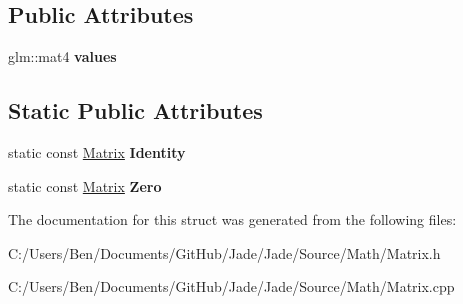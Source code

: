 \subsection*{Public Attributes}
\begin{DoxyCompactItemize}
\item 
\hypertarget{struct_jade_1_1_math_1_1_matrix_ab0c63eb1fb8024339519a780c4a18dc6}{}glm\+::mat4 {\bfseries values}\label{struct_jade_1_1_math_1_1_matrix_ab0c63eb1fb8024339519a780c4a18dc6}

\end{DoxyCompactItemize}
\subsection*{Static Public Attributes}
\begin{DoxyCompactItemize}
\item 
\hypertarget{struct_jade_1_1_math_1_1_matrix_a89bfcd378ee8aeba30f393a9bc431e49}{}static const \hyperlink{struct_jade_1_1_math_1_1_matrix}{Matrix} {\bfseries Identity}\label{struct_jade_1_1_math_1_1_matrix_a89bfcd378ee8aeba30f393a9bc431e49}

\item 
\hypertarget{struct_jade_1_1_math_1_1_matrix_a32ed6952707144091d2bee00c0af4cc4}{}static const \hyperlink{struct_jade_1_1_math_1_1_matrix}{Matrix} {\bfseries Zero}\label{struct_jade_1_1_math_1_1_matrix_a32ed6952707144091d2bee00c0af4cc4}

\end{DoxyCompactItemize}


The documentation for this struct was generated from the following files\+:\begin{DoxyCompactItemize}
\item 
C\+:/\+Users/\+Ben/\+Documents/\+Git\+Hub/\+Jade/\+Jade/\+Source/\+Math/Matrix.\+h\item 
C\+:/\+Users/\+Ben/\+Documents/\+Git\+Hub/\+Jade/\+Jade/\+Source/\+Math/Matrix.\+cpp\end{DoxyCompactItemize}
